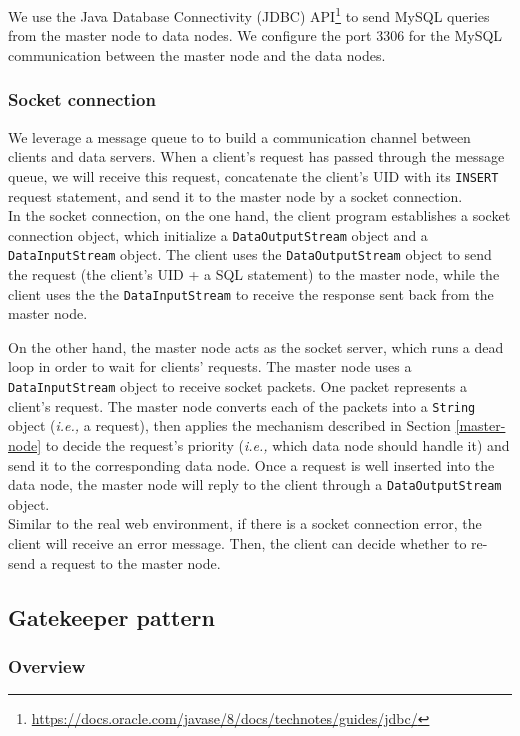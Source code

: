 \documentclass{article}
\begin{document}
We use the Java Database Connectivity (JDBC) API\footnote{\url{https://docs.oracle.com/javase/8/docs/technotes/guides/jdbc/}} to send MySQL queries from the master node to data nodes. We configure the port 3306 for the MySQL communication between the master node and the data nodes.

\subsubsection{Socket connection}
We leverage a message queue to to build a communication channel between clients and data servers. When a client's request has passed through the message queue, we will receive this request, concatenate the client's UID with its \texttt{INSERT} request statement, and send it to the master node by a socket connection.\\

In the socket connection, on the one hand, the client program establishes a socket connection object, which initialize a \texttt{DataOutputStream} object and a \texttt{DataInputStream} object. The client uses the \texttt{DataOutputStream} object to send the request (the client's UID + a SQL statement) to the master node, while the client uses the the \texttt{DataInputStream} to receive the response sent back from the master node.

On the other hand, the master node acts as the socket server, which runs a dead loop in order to wait for clients' requests. The master node uses a \texttt{DataInputStream} object to receive socket packets. One packet represents a client's request. The master node converts each of the packets into a \texttt{String} object (\emph{i.e.,} a request), then applies the mechanism described in Section \ref{master-node} to decide the request's priority (\emph{i.e.,} which data node should handle it) and send it to the corresponding data node. Once a request is well inserted into the data node, the master node will reply to the client through a \texttt{DataOutputStream} object.\\

Similar to the real web environment, if there is a socket connection error, the client will receive an error message. Then, the client can decide whether to re-send a request to the master node.

\subsection{Gatekeeper pattern}
\subsubsection{Overview}
\end{document}
